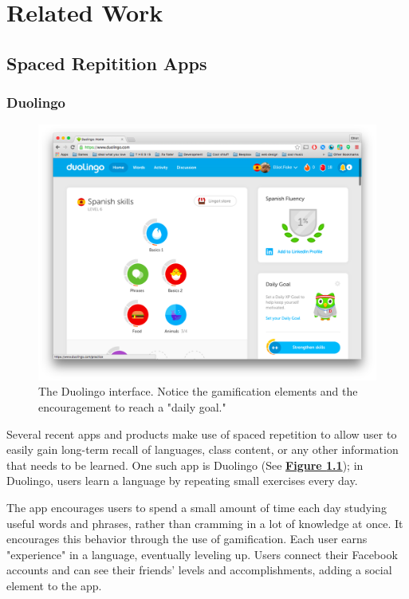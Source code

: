 \chapter{Related Work}


\section{Spaced Repitition Apps}
\subsection{Duolingo}

\begin{figure}
	\centerline{\includegraphics[width=1.2\linewidth]{duolingo}}
	\caption[Duolingo]{The Duolingo interface. Notice the gamification elements and the encouragement to reach a "daily goal."}
	\label{fig:duolingo}
\end{figure}

\par Several recent apps and products make use of spaced repetition to allow user to easily gain long-term recall of languages, class content, or any other information that needs to be learned. One such app is Duolingo (See \textbf{\hyperref[fig:duolingo]{Figure \ref*{fig:duolingo}}}); in Duolingo, users learn a language by repeating small exercises every day. 

\par The app encourages users to spend a small amount of time each day studying useful words and phrases, rather than cramming in a lot of knowledge at once. It encourages this behavior through the use of gamification. Each user earns "experience" in a language, eventually leveling up. Users connect their Facebook accounts and can see their friends' levels and accomplishments, adding a social element to the app. %

